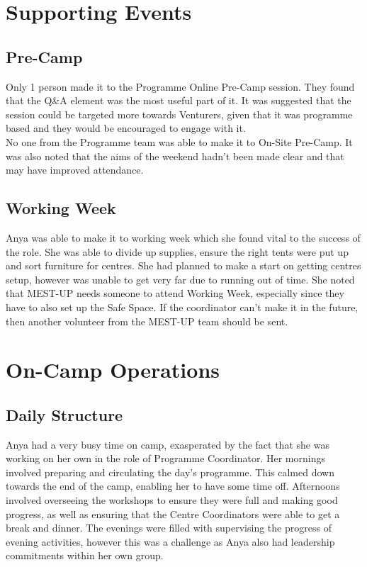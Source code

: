 \section{Supporting Events}
\subsection{Pre-Camp}
Only 1 person made it to the Programme Online Pre-Camp session. They found that the Q\&A element was the most useful part of it. It was suggested that the session could be targeted more towards Venturers, given that it was programme based and they would be encouraged to engage with it. \\

No one from the Programme team was able to make it to On-Site Pre-Camp. It was also noted that the aims of the weekend hadn't been made clear and that may have improved attendance. 
\subsection{Working Week}
Anya was able to make it to working week which she found vital to the success of the role. She was able to divide up supplies, ensure the right tents were put up and sort furniture for centres. She had planned to make a start on getting centres setup, however was unable to get very far due to running out of time. She noted that MEST-UP needs someone to attend Working Week, especially since they have to also set up the Safe Space. If the coordinator can't make it in the future, then another volunteer from the MEST-UP team should be sent. 

\section{On-Camp Operations}
\subsection{Daily Structure}
Anya had a very busy time on camp, exasperated by the fact that she was working on her own in the role of Programme Coordinator. Her mornings involved preparing and circulating the day's programme. This calmed down towards the end of the camp, enabling her to have some time off. Afternoons involved overseeing the workshops to ensure they were full and making good progress, as well as ensuring that the Centre Coordinators were able to get a break and dinner. The evenings were filled with supervising the progress of evening activities, however this was a challenge as Anya also had leadership commitments within her own group. 
